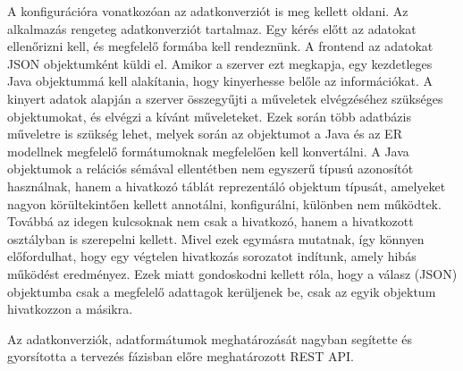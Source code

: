 A konfigurációra vonatkozóan az adatkonverziót is meg kellett oldani. Az alkalmazás rengeteg adatkonverziót tartalmaz. Egy kérés előtt az adatokat ellenőrizni kell, és megfelelő formába kell rendeznünk. A frontend az adatokat JSON objektumként küldi el. Amikor a szerver ezt megkapja, egy kezdetleges Java objektummá kell alakítania, hogy kinyerhesse belőle az információkat. A kinyert adatok alapján a szerver összegyűjti a műveletek elvégzéséhez szükséges objektumokat, és elvégzi a kívánt műveleteket. Ezek során több adatbázis műveletre is szükség lehet, melyek során az objektumot a Java és az ER modellnek megfelelő formátumoknak megfelelően kell konvertálni. A Java objektumok a relációs sémával ellentétben nem egyszerű típusú azonosítót használnak, hanem a hivatkozó táblát reprezentáló objektum típusát, amelyeket nagyon körültekintően kellett annotálni, konfigurálni, különben nem működtek. Továbbá az idegen kulcsoknak nem csak a hivatkozó, hanem a hivatkozott osztályban is szerepelni kellett. Mivel ezek egymásra mutatnak, így könnyen előfordulhat, hogy egy végtelen hivatkozás sorozatot indítunk, amely hibás működést eredményez. Ezek miatt gondoskodni kellett róla, hogy a válasz (JSON) objektumba csak a megfelelő adattagok kerüljenek be, csak az egyik objektum hivatkozzon a másikra.

Az adatkonverziók, adatformátumok meghatározását nagyban segítette és gyorsította a tervezés fázisban előre meghatározott REST API.
